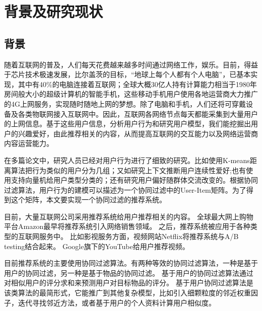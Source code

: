 \chapter{背景及研究现状}

\section{背景}
随着互联网的普及，人们每天花费越来越多时间通过网络工作，娱乐。目前，得益于芯片技术极速发展，比尔盖茨的目标，“地球上每个人都有个人电脑”，已基本实现，其中有40\%的电脑连接着互联网；全球大概30亿人持有计算能力相当于1980年房间般大小的超级计算机的智能手机，这些移动手机用户使用各地运营商大力推广的4G上网服务，实现随时随地上网的梦想。除了电脑和手机，人们还将可穿戴设备及各类物联网接入互联网中。因此，互联网各网络节点每天都能采集到大量用户的上网信息。基于这些用户信息，分析用户行为和研究用户模型，我们能挖掘出用户的兴趣爱好，由此推荐相关的内容，从而提高互联网的交互能力以及网络运营商内容运营能力。

在多篇论文中，研究人员已经对用户行为进行了细致的研究。比如使用K-means距离算法\parencite{杨清龙2013基于网络日志的互联网用户行为分析}把行为类似的用户分为几组；又如研究上下文推断用户连续性爱好\parencite{史艳翠2013基于通信数据的上下文移动用户偏好动态获取方法研究};也有使用支持向量机给用户类型分类的\parencite{程辉2013网络用户偏好分析及话题趋势预测方法研究}；还有研究用户偏好随群体交流改变的\parencite{张欢2014网络用户偏好分析方法的研究,程辉2013网络用户偏好分析及话题趋势预测方法研究}。根据协同过滤算法\parencite{resnick1994grouplens}，用户行为的建模可以描述为一个协同过滤中的User-Item矩阵。为了得到这个矩阵，本文要实现一个协同过滤的推荐系统。

目前，大量互联网公司采用推荐系统给用户推荐相关的内容。
全球最大网上购物平台Amazon最早将推荐系统引入网络销售领域\parencite{Linden2010Amazon}。
之后，推荐系统被应用于各种类型的互联网服务中。
比如影视服务方面，视频网站Netflix将推荐系统与A/B testing结合起来\parencite{Gomez2015The}。
Google旗下的YouTube给用户推荐视频\parencite{Davidson2010The}。

目前推荐系统的主要使用协同过滤算法。有两种等效的协同过滤算法，一种是基于用户的协同过滤，另一种是基于物品的协同过滤。
基于用户的协同过滤算法通过对相似用户的评分求和来预测用户对目标物品的评分\parencite{resnick1994grouplens}。
基于用户协同过滤算法是该类算法的最简形式\parencite{adomavicius2005toward}，它能推广到其他复杂模型，比如引入细颗粒度的邻近权重因子\parencite{herlocker2000explaining}，迭代寻找邻近方法\parencite{Zhang2007A}，或者基于用户的个人资料计算用户相似度\parencite{shi2009exploiting}。

